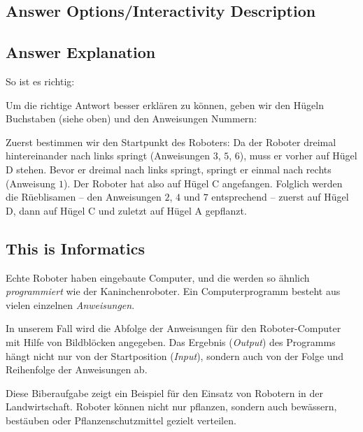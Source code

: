 \documentclass[a4paper,11pt]{report}
\newcommand{\taskGraphicsFolder}{..}
\begin{document}
\begingroup
\renewcommand{\arraystretch}{1.5}
\subsection*{Answer Options/Interactivity Description}



\endgroup

\subsection*{Answer Explanation}

So ist es richtig: \raisebox{-0.5ex}{}

Um die richtige Antwort besser erklären zu können, geben wir den Hügeln Buchstaben (siehe oben) und den Anweisungen Nummern:

{\centering%
\par}

Zuerst bestimmen wir den Startpunkt des Roboters: Da der Roboter dreimal hintereinander nach links springt (Anweisungen $3$, $5$, $6$), muss er vorher auf Hügel D stehen. Bevor er dreimal nach links springt, springt er einmal nach rechts (Anweisung $1$). Der Roboter hat also auf Hügel C angefangen.
Folglich werden die Rüeblisamen – den Anweisungen $2$, $4$ und $7$ entsprechend – zuerst auf Hügel D, dann auf Hügel C und zuletzt auf Hügel A gepflanzt.


\subsection*{This is Informatics}

Echte Roboter haben eingebaute Computer, und die werden so ähnlich \emph{programmiert} wie der Kaninchenroboter. Ein Computerprogramm besteht aus vielen einzelnen \emph{Anweisungen}.

In unserem Fall wird die Abfolge der Anweisungen für den Roboter-Computer mit Hilfe von Bildblöcken angegeben. Das Ergebnis (\emph{Output}) des Programms hängt nicht nur von der Startposition (\emph{Input}), sondern auch von der Folge und Reihenfolge der Anweisungen ab.

Diese Biberaufgabe zeigt ein Beispiel für den Einsatz von Robotern in der Landwirtschaft. Roboter können nicht nur pflanzen, sondern auch bewässern, bestäuben oder Pflanzenschutzmittel gezielt verteilen.
\end{document}
